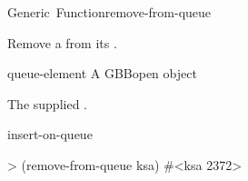\documentclass[10pt,twoside,english,pdftex]{article}
\begin{document}
\begin{functiondoc}{Generic~Function}{remove-from-queue}%
  { 
    \returns{} }
%

\fnsyntax

\fnpurpose Remove a  from its .

\fnmethods
{}%
  {\code{(} 
   \returns{} }

\fnpackage {}

\fnmodule {}

\fnargs
\begin{args}{queue-element}
 A GBBopen  object
\end{args}

\fnreturns The supplied .

\begin{alsos}{insert-on-queue}
\end{alsos}

\fnexample
%
\W\supp
\begin{example}
> (remove-from-queue ksa)
#<ksa 2372>
\end{example}

\end{functiondoc}

\end{document}
